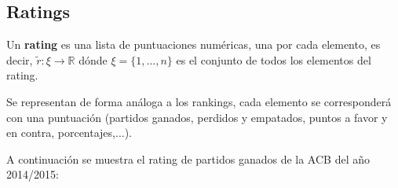 \subsection{Ratings}
\begin{defi} 
	Un \textbf{rating} es una lista de puntuaciones numéricas, una por cada elemento, es decir, $\tilde{r}: \xi \rightarrow \mathbb{R}$ dónde $\xi = \{1,...,n\}$ es el conjunto de todos los elementos del rating.
\end{defi}
Se representan de forma análoga a los rankings, cada elemento se corresponderá con una puntuación (partidos ganados, perdidos y empatados, puntos a favor y en contra, porcentajes,...).
 
\begin{ejem} \label{ejem2}
A continuación se muestra el rating de partidos ganados de la ACB del año 2014/2015:
\end{ejem}
	
